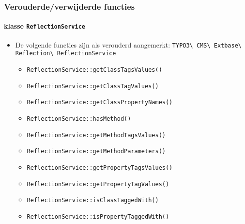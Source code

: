 
\begin{frame}[fragile]
	\frametitle{Verouderde/verwijderde functies}
	\framesubtitle{klasse \texttt{ReflectionService}}

	\begin{itemize}
		\item De volgende functies zijn als verouderd aangemerkt:\newline
			\smaller\texttt{TYPO3\textbackslash
				CMS\textbackslash
				Extbase\textbackslash
				Reflection\textbackslash
				ReflectionService}\normalsize

				\begin{itemize}\smaller
					\item \texttt{ReflectionService::getClassTagsValues()}
					\item \texttt{ReflectionService::getClassTagValues()}
					\item \texttt{ReflectionService::getClassPropertyNames()}
					\item \texttt{ReflectionService::hasMethod()}
					\item \texttt{ReflectionService::getMethodTagsValues()}
					\item \texttt{ReflectionService::getMethodParameters()}
					\item \texttt{ReflectionService::getPropertyTagsValues()}
					\item \texttt{ReflectionService::getPropertyTagValues()}
					\item \texttt{ReflectionService::isClassTaggedWith()}
					\item \texttt{ReflectionService::isPropertyTaggedWith()}
				\end{itemize}

	\end{itemize}

\end{frame}


